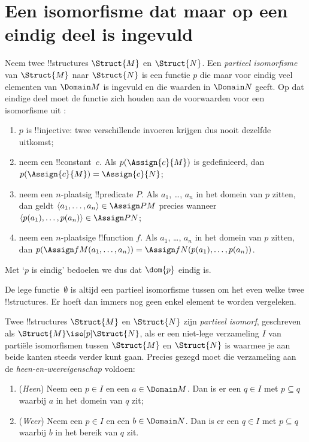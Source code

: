 \documentclass[../../../include/open-logic-section]{subfiles}
\begin{document}
\section{Een isomorfisme dat maar op een eindig deel is ingevuld}

\begin{defn}
  Neem twee !!{structure}s $\Struct{M}$ en $\Struct{N}$. Een
  \emph{partieel isomorfisme} van $\Struct{M}$ naar $\Struct{N}$ is
  een functie $p$ die maar voor eindig veel elementen van $\Domain M$
  is ingevuld en die waarden in $\Domain N$ geeft. Op dat eindige deel
  moet de functie zich houden aan de voorwaarden voor een isomorfisme uit
  :
  \begin{enumerate}
  \item $p$ is !!{injective}: twee verschillende invoeren krijgen dus
    nooit dezelfde uitkomst;
  \item neem een !!{constant}~$c$. Als $p(\Assign{c}{M})$ is
    gedefinieerd, dan $p(\Assign{c}{M}) = \Assign{c}{N}$;
  \item neem een $n$-plaatsig !!{predicate} $P$. Als $a_1$, \dots, $a_n$
    in het domein van $p$ zitten, dan geldt
    $\langle a_1, \dots, a_n\rangle \in \Assign P M$ precies wanneer
    $\langle p(a_1), \dots, p(a_n) \rangle \in \Assign P N$;
  \item neem een $n$-plaatsige !!{function} $f$. Als $a_1$, \dots, $a_n$
    in het domein van $p$ zitten, dan $p(\Assign f M (a_1, \dots,a_n))
    = \Assign f N (p(a_1), \dots, p(a_n))$.
  \end{enumerate}
  Met ‘$p$ is eindig’ bedoelen we dus dat $\dom{p}$ eindig is.
\end{defn}

De lege functie~$\emptyset$ is altijd een partieel isomorfisme tussen
om het even welke twee !!{structure}s. Er hoeft dan immers nog geen
enkel element te worden vergeleken.

\begin{defn}
  Twee !!{structure}s $\Struct{M}$ en $\Struct{N}$ zijn
  \emph{partieel isomorf}, geschreven als $\Struct{M} \iso[p]
  \Struct{N}$, als er een niet-lege verzameling $I$ van partiële
  isomorfismen tussen $\Struct{M}$ en $\Struct{N}$ is waarmee je aan
  beide kanten steeds verder kunt gaan. Precies gezegd moet die verzameling aan de
  \emph{heen-en-weereigenschap} voldoen:
  \begin{enumerate}
  \item (\emph{Heen}) Neem een $p \in I$ en een $a \in \Domain M$.
    Dan is er een $q \in I$ met $p \subseteq q$ waarbij $a$ in het
    domein van $q$ zit;
  \item (\emph{Weer}) Neem een $p \in I$ en een $b \in \Domain N$.
    Dan is er een $q \in I$ met $p \subseteq q$ waarbij $b$ in het
    bereik van $q$ zit.
  \end{enumerate}
\end{defn}
\end{document}
